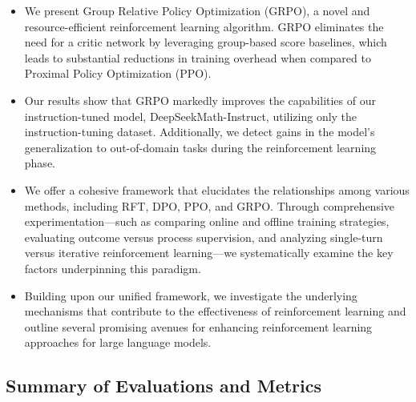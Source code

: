 \begin{itemize}[topsep=0pt]
    \item We present Group Relative Policy Optimization (GRPO), a novel and resource-efficient reinforcement learning algorithm. GRPO eliminates the need for a critic network by leveraging group-based score baselines, which leads to substantial reductions in training overhead when compared to Proximal Policy Optimization (PPO).
    \item Our results show that GRPO markedly improves the capabilities of our instruction-tuned model, DeepSeekMath-Instruct, utilizing only the instruction-tuning dataset. Additionally, we detect gains in the model's generalization to out-of-domain tasks during the reinforcement learning phase.
    \item We offer a cohesive framework that elucidates the relationships among various methods, including RFT, DPO, PPO, and GRPO. Through comprehensive experimentation—such as comparing online and offline training strategies, evaluating outcome versus process supervision, and analyzing single-turn versus iterative reinforcement learning—we systematically examine the key factors underpinning this paradigm.
    \item Building upon our unified framework, we investigate the underlying mechanisms that contribute to the effectiveness of reinforcement learning and outline several promising avenues for enhancing reinforcement learning approaches for large language models.
\end{itemize}

\subsection{Summary of Evaluations and Metrics}

